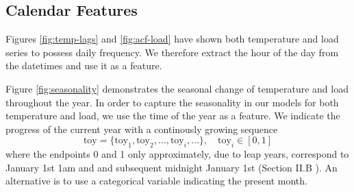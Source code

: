 \documentclass[conference]{IEEEtran}
\begin{document}
\subsection{Calendar Features}
\label{sec:calendar}
Figures \ref{fig:temp-lags} and \ref{fig:acf-load} have shown both temperature and load series to possess daily frequency. We therefore extract the hour of the day from the datetimes and use it as a feature.\par
Figure \ref{fig:seasonality} demonstrates the seasonal change of temperature and load throughout the year. In order to capture the seasonality in our models for both temperature and load, we use the time of the year as a feature. We indicate the progress of the current year with a continously growing sequence
\[
\text{toy}=\{\text{toy}_1, \text{toy}_2, \dots, \text{toy}_i, \dots\},\quad \text{toy}_i \in [0,1] 
\]
where the endpoints 0 and 1 only approximately, due to leap years, correspond to January 1st 1am and and subsequent midnight January 1st (Section II.B \cite{Goude2014}). An alternative is to use a categorical variable indicating the present month.
\end{document}
